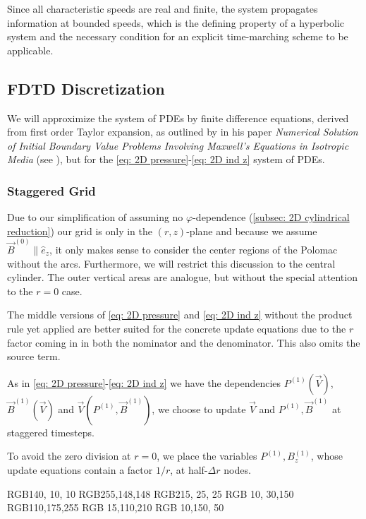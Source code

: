 Since all characteristic speeds are real and finite, the
system propagates information at bounded speeds, which is the defining property
of a hyperbolic system and the necessary condition for an explicit
time-marching scheme to be applicable.

\subsection{FDTD Discretization}
We will approximize the system of PDEs by finite difference equations,
derived from first order Taylor expansion,
as outlined by \citeauthor{Yee1966} in his paper \emph{Numerical Solution of Initial Boundary Value
Problems Involving Maxwell’s Equations
in Isotropic Media} (see \cite{Yee1966}), but for the \eqref{eq: 2D pressure}-\eqref{eq: 2D ind z} system of PDEs.

\subsubsection{Staggered Grid}
Due to our simplification of assuming no $\varphi$-dependence (\autoref{subsec: 2D cylindrical reduction})
our grid is only in the $(r,z)$-plane and because we assume $\vec{B}^{(0)}\parallel \hat{e}_z$,
it only makes sense to consider the center regions of the Polomac without the arcs.
Furthermore, we will restrict this discussion to the central cylinder.
The outer vertical areas are analogue, but without the special attention to the $r=0$ case.

The middle versions of \eqref{eq: 2D pressure} and \eqref{eq: 2D ind z} without the product rule
yet applied are better suited for the concrete update equations due to the $r$ factor coming in in both
the nominator and the denominator. This also omits the source term.

As in \eqref{eq: 2D pressure}-\eqref{eq: 2D ind z} we have the dependencies
$P^{(1)}(\vec{V})$, $\vec{B}^{(1)}(\vec{V})$ and $\vec{V}(P^{(1)},\vec{B}^{(1)})$,
we choose to update $\vec{V}$ and $P^{(1)},\vec{B}^{(1)}$ at staggered timesteps.

To avoid the zero division at $r=0$, we place the variables $P^{(1)},B^{(1)}_z$,
whose update equations contain a factor $1/r$, at half-$\Delta r$ nodes.




\definecolor{cVr} {RGB}{140, 10, 10}   %
\definecolor{cVz} {RGB}{255,148,148}   %
\definecolor{cVp} {RGB}{215, 25, 25}   %
\definecolor{cBr} {RGB}{ 10, 30,150}   %
\definecolor{cBz} {RGB}{110,175,255}   %
\definecolor{cBp} {RGB}{ 15,110,210}   %
\definecolor{cP}  {RGB}{ 10,150, 50}   %

